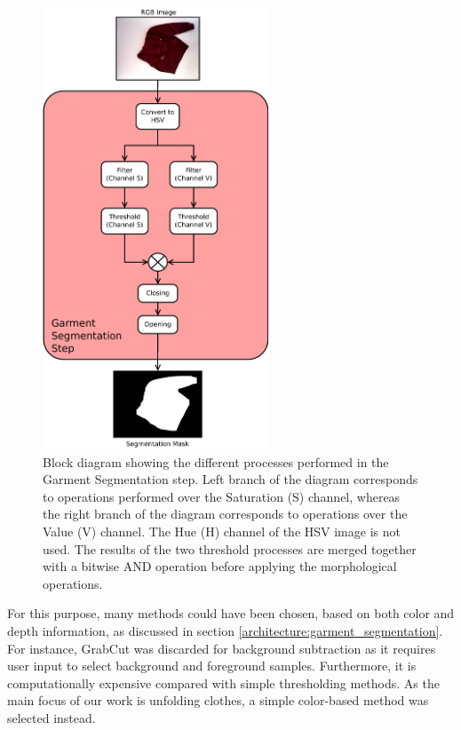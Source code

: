 \begin{figure}[thpb]
    \centering
    \includegraphics[width=0.6\textwidth]
    {figures/Garment-segmentation-process-diagram.pdf}
    \caption{Block diagram showing the different processes performed in the Garment Segmentation step. Left branch of the diagram corresponds to operations performed over the Saturation (S) channel, whereas the right branch of the diagram corresponds to operations over the Value (V) channel. The Hue (H) channel of the HSV image is not used. The results of the two threshold processes are merged together with a bitwise AND operation before applying the morphological operations.}
    \label{fig:background_subtration_processes}
\end{figure}

For this purpose, many methods could have been chosen, based on both color and depth information, as discussed in section \ref{architecture:garment_segmentation}. For instance, GrabCut \cite{rother2004grabcut} was discarded for background subtraction as it requires user input to select background and foreground samples. Furthermore, it is computationally expensive compared with simple thresholding methods. As the main focus of our work is unfolding clothes, a simple color-based method was selected instead. 


